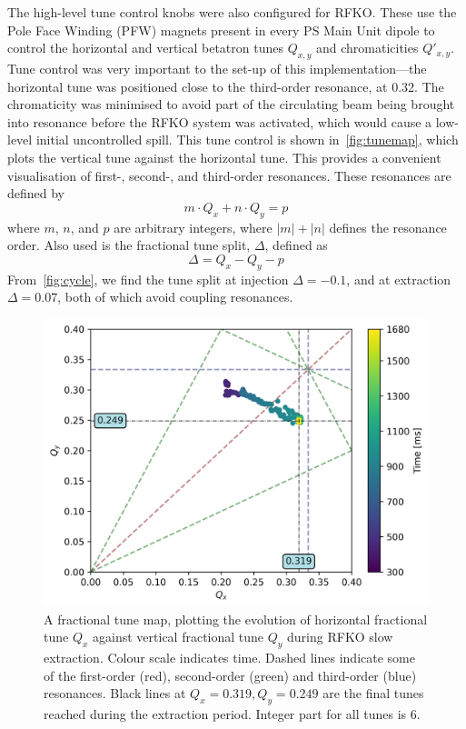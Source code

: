 \documentclass[a4paper,twoside,11pt]{report}
\begin{document}
The high-level tune control knobs were also configured for RFKO. These use the Pole Face Winding (PFW) magnets present in every PS Main Unit dipole to control the horizontal and vertical betatron tunes $Q_{x, y}$ and chromaticities $Q'_{x, y}$. Tune control was very important to the set-up of this implementation---the horizontal tune was positioned close to the third-order resonance, at 0.32. The chromaticity was minimised to avoid part of the circulating beam being brought into resonance before the RFKO system was activated, which would cause a low-level initial uncontrolled spill. This tune control is shown in~\autoref{fig:tunemap}, which plots the vertical tune against the horizontal tune. This provides a convenient visualisation of first-, second-, and third-order resonances. These resonances are defined by
\begin{equation}
  m\cdot Q_x+n\cdot Q_y=p
\end{equation} where $m$, $n$, and $p$ are arbitrary integers, where $|m|+|n|$ defines the resonance order. Also used is the fractional tune split, $\Delta$, defined as
\begin{equation}
  \Delta = Q_x-Q_y-p
\end{equation}
From~\autoref{fig:cycle}, we find the tune split at injection $\Delta=-0.1$, and at extraction $\Delta=0.07$, both of which avoid coupling resonances.

\begin{figure}
  \centering
  \includegraphics[width=0.6\linewidth]{tunemap.png}
  \caption[Fractional tune map during RFKO slow extraction]{A fractional tune map, plotting the evolution of horizontal fractional tune $Q_x$ against vertical fractional tune $Q_y$ during RFKO slow extraction. Colour scale indicates time. Dashed lines indicate some of the first-order (red), second-order (green) and third-order (blue) resonances. Black lines at $Q_x=0.319, Q_y=0.249$ are the final tunes reached during the extraction period. Integer part for all tunes is 6.}\label{fig:tunemap}
\end{figure}
\end{document}
